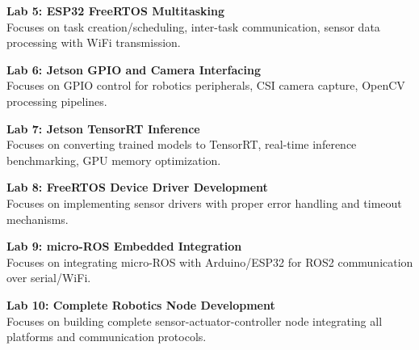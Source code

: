 \vspace{0.2cm}

\noindent\textbf{Lab 5: ESP32 FreeRTOS Multitasking} \\
Focuses on task creation/scheduling, inter-task communication, sensor data processing with WiFi transmission.

\vspace{0.2cm}

\noindent\textbf{Lab 6: Jetson GPIO and Camera Interfacing} \\
Focuses on GPIO control for robotics peripherals, CSI camera capture, OpenCV processing pipelines.

\vspace{0.2cm}

\noindent\textbf{Lab 7: Jetson TensorRT Inference} \\
Focuses on converting trained models to TensorRT, real-time inference benchmarking, GPU memory optimization.

\vspace{0.2cm}

\noindent\textbf{Lab 8: FreeRTOS Device Driver Development} \\
Focuses on implementing sensor drivers with proper error handling and timeout mechanisms.

\vspace{0.2cm}

\noindent\textbf{Lab 9: micro-ROS Embedded Integration} \\
Focuses on integrating micro-ROS with Arduino/ESP32 for ROS2 communication over serial/WiFi.

\vspace{0.2cm}

\noindent\textbf{Lab 10: Complete Robotics Node Development} \\
Focuses on building complete sensor-actuator-controller node integrating all platforms and communication protocols.

\vspace{0.2cm}

\newpage
{}
